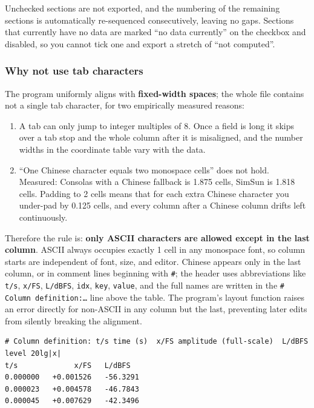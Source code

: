 \documentclass[UTF8,a4paper,12pt]{ctexart}
\begin{document}
Unchecked sections are not exported, and the numbering of the remaining sections is automatically re-sequenced consecutively, leaving no gaps. Sections that currently have no data are marked ``no data currently'' on the checkbox and disabled, so you cannot tick one and export a stretch of ``not computed''.

\subsubsection*{Why not use tab characters}

The program uniformly aligns with \textbf{fixed-width spaces}; the whole file contains not a single tab character, for two empirically measured reasons:

\begin{enumerate}
  \item A tab can only jump to integer multiples of 8. Once a field is long it skips over a tab stop and the whole column after it is misaligned, and the number widths in the coordinate table vary with the data.
  \item ``One Chinese character equals two monospace cells'' does not hold. Measured: Consolas with a Chinese fallback is 1.875 cells, SimSun is 1.818 cells. Padding to 2 cells means that for each extra Chinese character you under-pad by 0.125 cells, and every column after a Chinese column drifts left continuously.
\end{enumerate}

Therefore the rule is: \textbf{only ASCII characters are allowed except in the last column}. ASCII always occupies exactly 1 cell in any monospace font, so column starts are independent of font, size, and editor. Chinese appears only in the last column, or in comment lines beginning with \texttt{\#}; the header uses abbreviations like \texttt{t/s}, \texttt{x/FS}, \texttt{L/dBFS}, \texttt{idx}, \texttt{key}, \texttt{value}, and the full names are written in the \texttt{\# Column definition:\dots} line above the table. The program's layout function raises an error directly for non-ASCII in any column but the last, preventing later edits from silently breaking the alignment.

\begin{center}
\begin{minipage}{0.96\textwidth}
\begin{lstlisting}
# Column definition: t/s time (s)  x/FS amplitude (full-scale)  L/dBFS level 20lg|x|
t/s             x/FS   L/dBFS
0.000000   +0.001526   -56.3291
0.000023   +0.004578   -46.7843
0.000045   +0.007629   -42.3496
\end{lstlisting}
\end{minipage}
\end{center}
\end{document}
